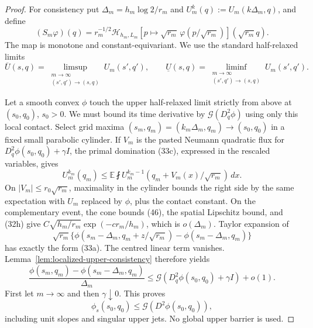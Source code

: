 \documentclass{smfart}
\theoremstyle{definition}
\newcommand{\1}{\mathbf 1}
\begin{document}
\begin{proof}
For consistency put $\Delta_m=h_m\log2/r_m$ and
$U_m^k(q):=U_m(k\Delta_m,q)$, and define
\begin{equation}
(S_ m\varphi)(q)=r_ m^{-1/2}\mathcal H_ {h_ m,L_ m}
[p\mapsto\sqrt{r_ m}\,\varphi(p/\sqrt{r_ m})](\sqrt{r_ m}q).
\tag{46b}
\end{equation}
The map is monotone and constant-equivariant.
We use the standard half-relaxed limits
\[
\overline U(s,q)=\limsup_{\substack{m\to\infty\\(s',q')\to(s,q)}}
U_m(s',q'),\qquad
\underline U(s,q)=\liminf_{\substack{m\to\infty\\(s',q')\to(s,q)}}
U_m(s',q').
\]

Let a smooth convex $\phi$ touch the upper half-relaxed limit strictly
from above at $(s_0,q_0)$, $s_0>0$.  We must bound its time derivative
by $\mathcal G(D_q^2\phi)$ using only this local contact.
Select grid maxima
$(s_ m,q_ m)=(k_ m\Delta_ m,q_ m)\to(s_ 0,q_ 0)$ in a fixed small
parabolic cylinder.  If $V_ m$ is the pasted Neumann quadratic flux for
$D_ q^2\phi(s_ 0,q_ 0)+\gamma I$, the primal domination (33c), expressed
in the rescaled variables, gives
\begin{equation}
U_ m^{k_ m}(q_ m)
\leq\mathbb E\fint
U_ m^{k_ m-1}(q_ m+V_ m(x)/\sqrt{r_ m})\,dx.
\tag{46c}
\end{equation}
On $|V_ m|\leq r_ 0\sqrt{r_ m}$, maximality in the cylinder bounds the
right side by the same expectation with $U_ m$ replaced by
$\phi$, plus the contact constant.  On the complementary event, the
cone bounds (46), the spatial Lipschitz bound, and (32h) give
$C\sqrt{h_ m/r_ m}\exp(-c r_ m/h_ m)$, which is
$o(\Delta_ m)$.  Taylor expansion of
\begin{equation*}
\sqrt{r_ m}\{\phi(s_ m-\Delta_ m,q_ m+z/\sqrt{r_ m})
-\phi(s_ m-\Delta_ m,q_ m)\}
\end{equation*}
has exactly the form (33a).  The centred linear term vanishes.  Lemma~\ref{lem:localized-upper-consistency} therefore yields
\begin{equation}
\frac{\phi(s_ m,q_ m)-\phi(s_ m-\Delta_ m,q_ m)}{\Delta_ m}
\leq \mathcal G(D_ q^2\phi(s_ 0,q_ 0)+\gamma I)+o(1).
\tag{46d}
\end{equation}
First let $m\to\infty$ and then $\gamma\downarrow0$.  This proves
\begin{equation}
\phi_ s(s_ 0,q_ 0)\leq \mathcal G(D^2\phi(s_ 0,q_ 0)),
\tag{47}
\end{equation}
including unit slopes and singular upper jets.  No global upper barrier
is used.


\end{proof}
\end{document}
